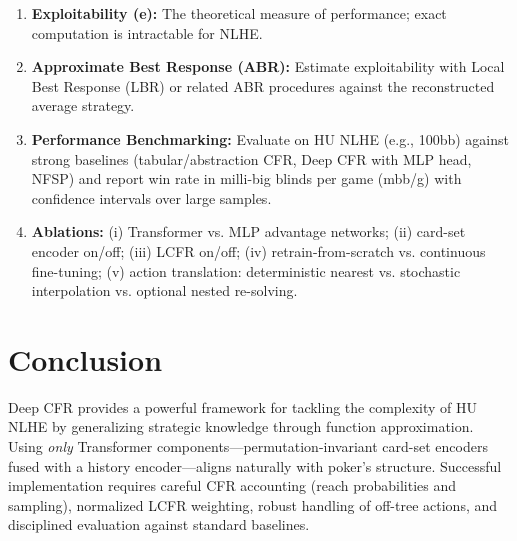 \documentclass[11pt,a4paper]{article}
\begin{document}
\begin{enumerate}
    \item \textbf{Exploitability (e):} The theoretical measure of performance; exact computation is intractable for NLHE.
    \item \textbf{Approximate Best Response (ABR):} Estimate exploitability with Local Best Response (LBR) or related ABR procedures against the reconstructed average strategy.
    \item \textbf{Performance Benchmarking:} Evaluate on HU NLHE (e.g., 100bb) against strong baselines (tabular/abstraction CFR, Deep CFR with MLP head, NFSP) and report win rate in milli-big blinds per game (mbb/g) with confidence intervals over large samples.
    \item \textbf{Ablations:} (i) Transformer vs. MLP advantage networks; (ii) card-set encoder on/off; (iii) LCFR on/off; (iv) retrain-from-scratch vs. continuous fine-tuning; (v) action translation: deterministic nearest vs. stochastic interpolation vs. optional nested re-solving.
\end{enumerate}

\section{Conclusion}

Deep CFR provides a powerful framework for tackling the complexity of HU NLHE by generalizing strategic knowledge through function approximation. Using \emph{only} Transformer components—permutation-invariant card-set encoders fused with a history encoder—aligns naturally with poker's structure. Successful implementation requires careful CFR accounting (reach probabilities and sampling), normalized LCFR weighting, robust handling of off-tree actions, and disciplined evaluation against standard baselines.

 
 

 
\end{document}
